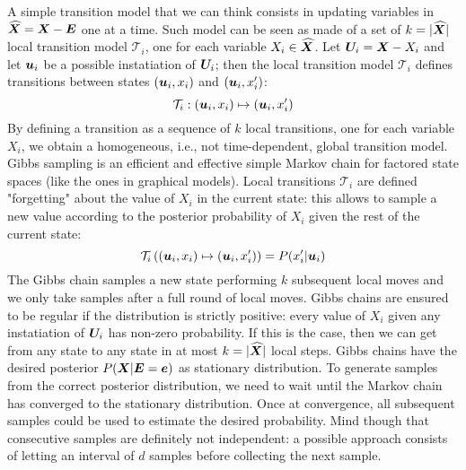 A simple transition model that we can think consists in updating variables in $\widehat{\bm{X}}=\bm{X}-\bm{E}$ one at a time. Such model can be seen as made of a set of $k=\vert\widehat{\bm{X}}\vert$ local transition model $\mathcal{T}_i$, one for each variable $X_i\in\widehat{\bm{X}}$. Let $\bm{U}_i=\bm{X}-X_i$ and let $\bm{u}_i$ be a possible instatiation of $\bm{U}_i$; then the local transition model $\mathcal{T}_i$ defines transitions between states $(\bm{u}_i, x_i)$ and $(\bm{u}_i, x_i')$:
\[\mathcal{T}_i:(\bm{u}_i, x_i)\mapsto (\bm{u}_i, x_i') \]
By defining a transition as a sequence of $k$ local transitions, one for each variable $X_i$, we obtain a homogeneous, i.e., not time-dependent, global transition model. 
Gibbs sampling is an efficient and effective simple Markov chain for factored state spaces (like the ones in graphical models). \newline
Local transitions $\mathcal{T}_i$ are defined "forgetting" about the value of $X_i$ in the current state: this allows to sample a new value according to the posterior probability of $X_i$ given the rest of the current state:
\[\mathcal{T}_i\left((\bm{u}_i,x_i)\mapsto(\bm{u}_i, x_i')\right)=P(x_i'\vert\bm{u}_i)\]
The Gibbs chain samples a new state performing $k$ subsequent local moves and we only take samples after a full round of local moves. \newline
Gibbs chains are ensured to be regular if the distribution is strictly positive: every value of $X_i$ given any instatiation of $\bm{U}_i$ has non-zero probability. If this is the case, then we can get from any state to any state in at most $k=\vert\widehat{\bm{X}}\vert$ local steps. \newline
Gibbs chains have the desired posterior $P(\bm{X}\vert \bm{E}=\bm{e})$ as stationary distribution. \newline
To generate samples from the correct posterior distribution, we need to wait until the Markov chain has converged to the stationary distribution. Once at convergence, all subsequent samples could be used to estimate the desired probability. \newline
Mind though that consecutive samples are definitely not independent: a possible approach consists of letting an interval of $d$ samples before collecting the next sample. 
%
%
